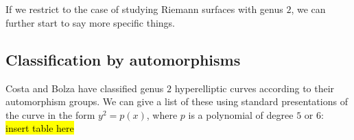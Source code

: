 \documentclass{article}
\begin{document}
\section{}
If we restrict to the case of studying Riemann surfaces with genus $2$, we can further start to say more specific things. 
\subsection{Classification by automorphisms}
Costa \cite{Costa2001} and Bolza \cite{Bolza1887} have classified genus $2$ hyperelliptic curves according to their automorphism groups. We can give a list of these using standard presentations of the curve in the form $y^2=p(x)$, where $p$ is a polynomial of degree $5$ or $6$:\\
\hl{insert table here}\\
\end{document}
